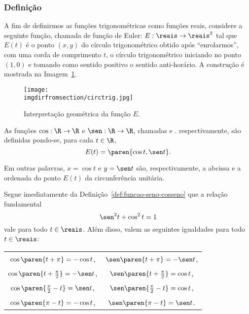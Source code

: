 \subsubsection{Definição}

A fim de definirmos as funções trigonométricas como funções
reais, considere a seguinte função, chamada de função de Euler: $E:
\reais \to \reais^2$ tal que $E(t)$ é o ponto $(x, y)$ do círculo
trigonométrico obtido após ``enrolarmos'', com uma corda de comprimento
$t$, o círculo trigonométrico iniciando no ponto $(1, 0)$ e tomando
como sentido positivo o sentido anti-horário. 
A construção é mostrada na Imagem~\ref{fig:ciclo-trigonometrico}.

\begin{figure}[H]
\centering
\texttt{[image: \\imgdirfromsection/circtrig.jpg]}
\caption{Interpretação geométrica da função $E$.}
\label{fig:ciclo-trigonometrico}
\end{figure}

\begin{definition}
\label{def:funcao-seno-cosseno}
    As funções $\cos : \R \to \R$ e $\sen : \R \to \R$, chamadas
 e . respectivamente, são
definidas pondo-se, para cada $t \in \R$,
$$E(t) = \paren{\cos t , \sen t}.$$

Em outras palavras, $x= \cos t$ e $y = \sen t$ são, respectivamente,
a abcissa e a ordenada do ponto $E(t)$ da circunferência unitária.
\end{definition}

Segue imediatamente da Definição~\ref{def:funcao-seno-cosseno} que a
relação fundamental $$ \sen^2 t + \cos^2 t = 1$$ vale para todo $t
\in \reais$.
Além disso, valem as seguintes igualdades para todo $t \in \reais$:
\begin{center}
\begin{tabular}{ c c }
    $\cos \paren{t+ \pi} = -\cos t$, & $\sen \paren{t+ \pi} = -\sen t$, \\
    $\cos \paren{t+ \frac {\pi} 2} = -\sen t$, & $\sen \paren{t+ \frac {\pi} 2} = \cos t$, \\
    $\cos \paren{ \frac {\pi} 2 -t} = \sen t$, & $\sen \paren{ \frac {\pi} 2 -t} = \cos t$, \\
    $\cos \paren{ \pi -t} = -\cos t$, & $\sen \paren{ \pi -t} = \sen t$. \\
  \end{tabular}
\end{center}

